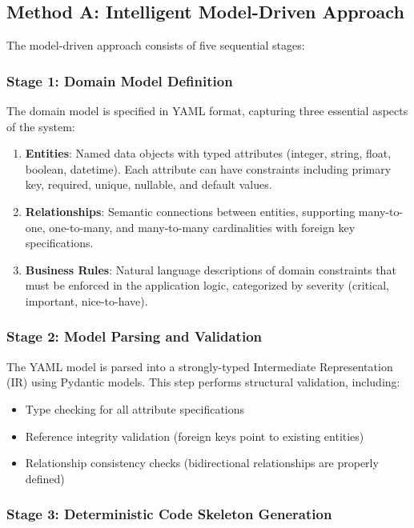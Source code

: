 \documentclass[11pt,a4paper]{article}
\begin{document}
\subsection{Method A: Intelligent Model-Driven Approach}

The model-driven approach consists of five sequential stages:

\subsubsection{Stage 1: Domain Model Definition}

The domain model is specified in YAML format, capturing three essential aspects of the system:

\begin{enumerate}[leftmargin=*]
    \item \textbf{Entities}: Named data objects with typed attributes (integer, string, float, boolean, datetime). Each attribute can have constraints including primary key, required, unique, nullable, and default values.
    \item \textbf{Relationships}: Semantic connections between entities, supporting many-to-one, one-to-many, and many-to-many cardinalities with foreign key specifications.
    \item \textbf{Business Rules}: Natural language descriptions of domain constraints that must be enforced in the application logic, categorized by severity (critical, important, nice-to-have).
\end{enumerate}

\subsubsection{Stage 2: Model Parsing and Validation}

The YAML model is parsed into a strongly-typed Intermediate Representation (IR) using Pydantic models. This step performs structural validation, including:

\begin{itemize}
    \item Type checking for all attribute specifications
    \item Reference integrity validation (foreign keys point to existing entities)
    \item Relationship consistency checks (bidirectional relationships are properly defined)
\end{itemize}

\subsubsection{Stage 3: Deterministic Code Skeleton Generation}
\end{document}
